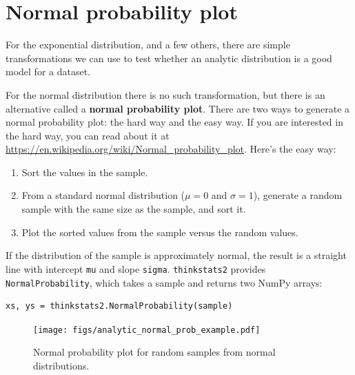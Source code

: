 \documentclass[12pt]{book}
\theoremstyle{exercise}
\begin{document}
\section{Normal probability plot}

For the exponential distribution, and a few others, there are
simple transformations we can use to test whether an analytic
distribution is a good model for a dataset.%
%
%

For the normal distribution there is no such transformation, but there
is an alternative called a {\bf normal probability plot}.  There
are two ways to generate a normal probability plot: the hard way
and the easy way.  If you are interested in the hard way, you can
read about it at \url{https://en.wikipedia.org/wiki/Normal_probability_plot}.
Here's the easy way:%
%
%
%
%
%

\begin{enumerate}

\item Sort the values in the sample.

\item From a standard normal distribution ($\mu=0$ and $\sigma=1$),
generate a random sample with the same size as the sample, and sort it.%

\item Plot the sorted values from the sample versus the random values.

\end{enumerate}

If the distribution of the sample is approximately normal, the result
is a straight line with intercept {\tt mu} and slope {\tt sigma}.
{\tt thinkstats2} provides {\tt NormalProbability}, which takes a
sample and returns two NumPy arrays:%

\begin{verbatim}
xs, ys = thinkstats2.NormalProbability(sample)
\end{verbatim}

\begin{figure}
\centerline{\texttt{[image: figs/analytic\_normal\_prob\_example.pdf]}}
\caption{Normal probability plot for random samples from normal distributions.}%
\label{analytic_normal_prob_example}
\end{figure}
\end{document}
